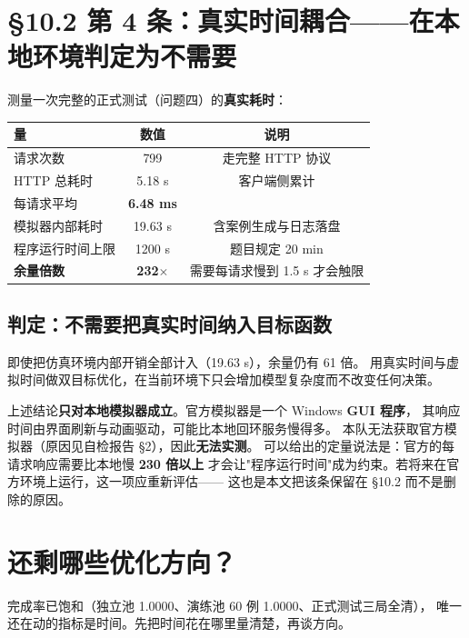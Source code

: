 \section{§10.2 第 4 条：真实时间耦合——\textbf{在本地环境判定为不需要}}

测量一次完整的正式测试（问题四）的\textbf{真实耗时}：

\begin{center}
\begin{tabular}{lcc}
\toprule
量 & 数值 & 说明 \\ \midrule
请求次数 & 799 & 走完整 HTTP 协议 \\
HTTP 总耗时 & 5.18 s & 客户端侧累计 \\
每请求平均 & \textbf{6.48 ms} & \\
模拟器内部耗时 & 19.63 s & 含案例生成与日志落盘 \\
程序运行时间上限 & 1200 s & 题目规定 20 min \\
\textbf{余量倍数} & \textbf{232$\times$} & 需要每请求慢到 1.5 s 才会触限 \\
\bottomrule
\end{tabular}
\end{center}

\subsection{判定：不需要把真实时间纳入目标函数}

即使把仿真环境内部开销全部计入（19.63 s），余量仍有 61 倍。
用真实时间与虚拟时间做双目标优化，在当前环境下只会增加模型复杂度而不改变任何决策。

\begin{warnbox}[title=一个不能忽略的保留意见]
上述结论\textbf{只对本地模拟器成立}。官方模拟器是一个 Windows \textbf{GUI 程序}，
其响应时间由界面刷新与动画驱动，可能比本地回环服务慢得多。
本队无法获取官方模拟器（原因见自检报告 §2），因此\textbf{无法实测}。
可以给出的定量说法是：官方的每请求响应需要比本地慢 \textbf{230 倍以上}
才会让"程序运行时间"成为约束。若将来在官方环境上运行，这一项应重新评估——
这也是本文把该条保留在 §10.2 而不是删除的原因。
\end{warnbox}

\section{还剩哪些优化方向？}

完成率已饱和（独立池 1.0000、演练池 60 例 1.0000、正式测试三局全清），
唯一还在动的指标是时间。先把时间花在哪里量清楚，再谈方向。

